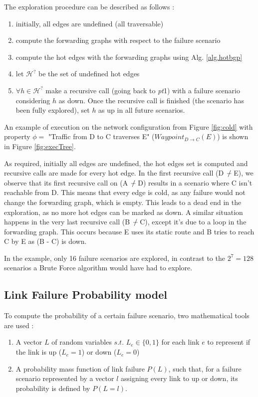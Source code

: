 The exploration procedure can be described as follows : 
\begin{enumerate}
  \item[0)] initially, all edges are undefined (all traversable)
  \item compute the forwarding graphs with respect to the failure scenario
  \item compute the hot edges with the forwarding graphs using Alg. \ref{alg.hotbgp}
  \item let $\mathcal{H}^?$ be the set of undefined hot edges
  \item $\forall h \in \mathcal{H}^?$ make a recursive call (going back to \textit{pt}1) with a failure scenario considering $h$ as down. Once the recursive call is finished (the scenario has been fully explored), set $h$ as up in all future scenarios. 
\end{enumerate}

An example of execution on the network configuration from Figure \ref{fig:cold} with property $\phi =$ "Traffic from D to C traverses E" ($Waypoint_{D\rightarrow C}(E)$) is shown in Figure \ref{fig:execTree}.

As required, initially all edges are undefined, the hot edges set is computed and recursive calls are made for every hot edge. In the first recursive call (D ${-}\mkern-11mu{/}$ E), we observe that its first recursive call on (A ${-}\mkern-11mu{/}$ D) results in a scenario where C isn't reachable from D. This means that every edge is cold, as any failure would not change the forwarding graph, which is empty.
This leads to a dead end in the exploration, as no more hot edges can be marked as down.
A similar situation happens in the very last recursive call (B ${-}\mkern-11mu{/}$ C), except it's due to a loop in the forwarding graph.
This occurs because E uses its static route and B tries to reach C by E as (B - C) is down.


In the example, only 16 failure scenarios are explored, in contrast to the $2^7 = 128$ scenarios a Brute Force algorithm would have had to explore.



\subsection{Link Failure Probability model} \label{sec:ProbFailMod}
To compute the probability of a certain failure scenario, two mathematical tools are used :
\begin{enumerate}
  \item A vector $L$ of random variables $s.t.$ $L_e \in \{0,1\}$ for each link $e$ to represent if the link is up ($L_e = 1$) or down ($L_e = 0$) 
  \item A probability mass function of link failure $P(L)$, such that, for a failure scenario represented by a vector $l$ assigning every link to up or down, its probability is defined by $P(L = l)$.
\end{enumerate}

